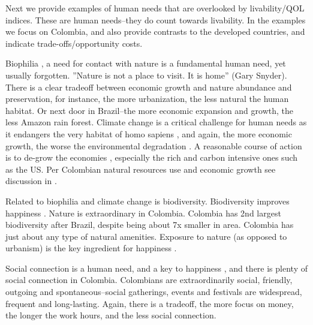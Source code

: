 \documentclass[10pt, letterpaper]{article}
\begin{document}
\begin{spacing}{2}
Next we provide examples of human needs that are overlooked by livability/QOL
indices. These are human needs--they do count towards livability. 
 In the examples we focus on Colombia, and also provide contrasts to the
 developed countries, and indicate trade-offs/opportunity costs. 

 Biophilia \citep{fromm64,wilson21}, a need for contact with nature is a fundamental human need, yet usually forgotten. ''Nature is not a place to visit. It is home'' (Gary Snyder).
 There is a clear tradeoff between economic growth and nature abundance and preservation,
 for instance, the more urbanization, the less natural the human habitat. Or
 next door in Brazil--the more economic expansion and growth, the less Amazon rain forest.
 Climate change is a critical challenge for human needs as it endangers the very
 habitat of homo sapiens \citep{pachauri14}, and again, the more economic growth, the worse the
 environmental degradation  \citep[e.g.,][]{klein14}. %
 A reasonable course of action is to
 de-grow the economies \citep{hickel20,kallis11}, especially the rich and carbon
 intensive ones such as the US. {Per Colombian natural resources use and economic growth see discussion in \citet{rubianoNYT22nov16}.}  
  

Related to biophilia and climate change is biodiversity. Biodiversity
improves  happiness \citep{adjei15,prescott17}. 
 Nature  is extraordinary in Colombia. Colombia has 2nd largest biodiversity
after Brazil, despite being about 7x smaller in area. Colombia has just about
any type of natural amenities. Exposure to  nature (as opposed to urbanism) is
the key ingredient for happiness \citep{pretty12,tesson13,thoreau95}.

 Social connection is a human need, and a key to happiness 
\citep{tonnies57,lane00,mcmahon06,putnam01}, and there is plenty of social connection in
Colombia. Colombians are extraordinarily social, friendly, outgoing and
spontaneous--social gatherings, events and festivals are widespread, frequent
and long-lasting. Again, there is a tradeoff, the more focus on money, the longer
the work hours, and the less social connection.


\end{spacing}
\end{document}
